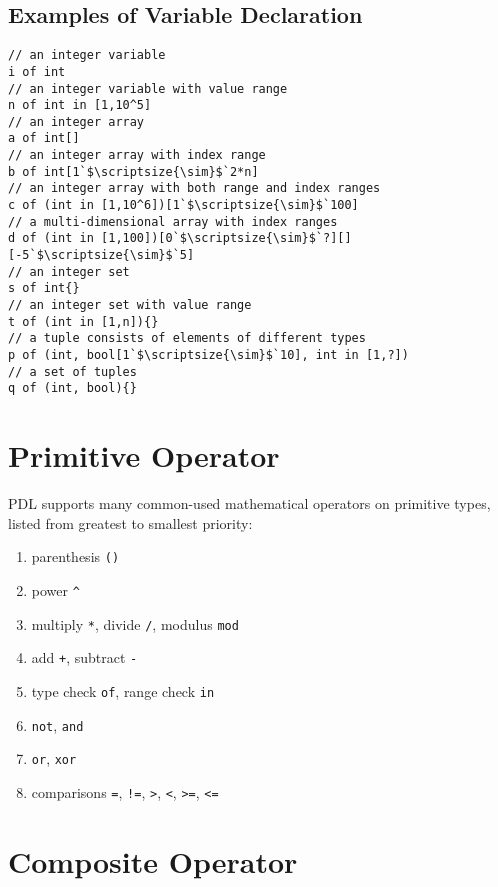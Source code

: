 \documentclass{report}
\begin{document}
\subsection{Examples of Variable Declaration}

\begin{lstlisting}
// an integer variable
i of int
// an integer variable with value range
n of int in [1,10^5]
// an integer array
a of int[]
// an integer array with index range
b of int[1`$\scriptsize{\sim}$`2*n]
// an integer array with both range and index ranges
c of (int in [1,10^6])[1`$\scriptsize{\sim}$`100]
// a multi-dimensional array with index ranges
d of (int in [1,100])[0`$\scriptsize{\sim}$`?][][-5`$\scriptsize{\sim}$`5]
// an integer set
s of int{}
// an integer set with value range
t of (int in [1,n]){}
// a tuple consists of elements of different types
p of (int, bool[1`$\scriptsize{\sim}$`10], int in [1,?])
// a set of tuples
q of (int, bool){}
\end{lstlisting}

\section{Primitive Operator}

PDL supports many common-used mathematical operators on primitive types,  listed from greatest to smallest priority: 
\begin{enumerate}
    \item parenthesis \texttt{()}
    \item power \texttt{\^{}}
    \item multiply \texttt{*}, divide \texttt{/}, modulus \texttt{mod}
    \item add \texttt{+}, subtract \texttt{-}
    \item type check \texttt{of}, range check \texttt{in}
    \item \texttt{not}, \texttt{and}
    \item \texttt{or}, \texttt{xor}
    \item comparisons \texttt{=}, \texttt{!=}, \texttt{>}, \texttt{<}, \texttt{>=}, \texttt{<=}
\end{enumerate}

\section{Composite Operator}
\end{document}

